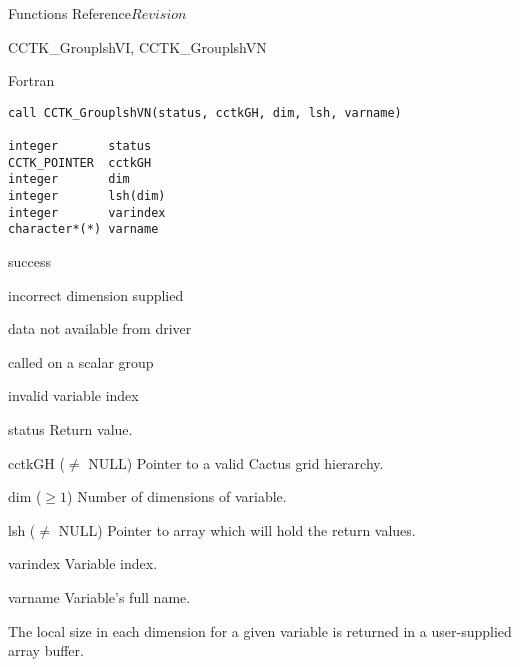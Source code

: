 \begin{cactuspart}{ Functions Reference}{}{$Revision$}
\begin{FunctionDescription}{CCTK\_GrouplshVI, CCTK\_GrouplshVN}
\begin{SynopsisSection}
\begin{Synopsis}{Fortran}
\begin{verbatim}
call CCTK_GrouplshVN(status, cctkGH, dim, lsh, varname)

integer       status
CCTK_POINTER  cctkGH
integer       dim
integer       lsh(dim)
integer       varindex
character*(*) varname
\end{verbatim}
\end{Synopsis}
\end{SynopsisSection}

\begin{ResultSection}
\begin{Result}{0} success \end{Result}
\begin{Result}{-1} incorrect dimension supplied \end{Result}
\begin{Result}{-2} data not available from driver \end{Result}
\begin{Result}{-3} called on a scalar group \end{Result}
\begin{Result}{-4} invalid variable index \end{Result}
\end{ResultSection}

\begin{ParameterSection}
\begin{Parameter}{status} Return value. \end{Parameter}
\begin{Parameter}{cctkGH ($\ne$ NULL)} Pointer to a valid Cactus grid hierarchy. \end{Parameter}
\begin{Parameter}{dim ($\ge 1$)} Number of dimensions of variable. \end{Parameter}
\begin{Parameter}{lsh ($\ne$ NULL)} Pointer to array which will hold the return values. \end{Parameter}
\begin{Parameter}{varindex} Variable index. \end{Parameter}
\begin{Parameter}{varname} Variable's full name. \end{Parameter}
\end{ParameterSection}

\begin{Discussion}
The local size in each dimension for a given variable is returned in a user-supplied array buffer.
\end{Discussion}


\end{FunctionDescription}
\end{cactuspart}
